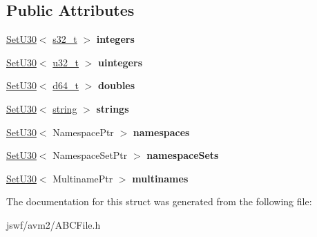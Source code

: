 \subsection*{Public Attributes}
\begin{DoxyCompactItemize}
\item 
\hypertarget{structjswf_1_1avm2_1_1_constant_pool_aab573ed0ddae6cc8a9e66ccb927fb46f}{\hyperlink{classjswf_1_1avm2_1_1_constant_pool_1_1_set_u30}{Set\+U30}$<$ \hyperlink{namespacejswf_a19b2a5980fe3b05994a2127a3c7e0521}{s32\+\_\+t} $>$ {\bfseries integers}}\label{structjswf_1_1avm2_1_1_constant_pool_aab573ed0ddae6cc8a9e66ccb927fb46f}

\item 
\hypertarget{structjswf_1_1avm2_1_1_constant_pool_a605cf0668e98e28d76797a4c6d699368}{\hyperlink{classjswf_1_1avm2_1_1_constant_pool_1_1_set_u30}{Set\+U30}$<$ \hyperlink{namespacejswf_ae68dd480b6437e9a20db7b004283a466}{u32\+\_\+t} $>$ {\bfseries uintegers}}\label{structjswf_1_1avm2_1_1_constant_pool_a605cf0668e98e28d76797a4c6d699368}

\item 
\hypertarget{structjswf_1_1avm2_1_1_constant_pool_a676c0a5a79c9e364979797a4bd9debfa}{\hyperlink{classjswf_1_1avm2_1_1_constant_pool_1_1_set_u30}{Set\+U30}$<$ \hyperlink{namespacejswf_acfbb3c7c9fbb807e233387995eb76a96}{d64\+\_\+t} $>$ {\bfseries doubles}}\label{structjswf_1_1avm2_1_1_constant_pool_a676c0a5a79c9e364979797a4bd9debfa}

\item 
\hypertarget{structjswf_1_1avm2_1_1_constant_pool_a27a70d2cfeb499e512c4fe444a5c0d55}{\hyperlink{classjswf_1_1avm2_1_1_constant_pool_1_1_set_u30}{Set\+U30}$<$ \hyperlink{namespacejswf_a755127d61081aa8af105eb800aa2c1ec}{string} $>$ {\bfseries strings}}\label{structjswf_1_1avm2_1_1_constant_pool_a27a70d2cfeb499e512c4fe444a5c0d55}

\item 
\hypertarget{structjswf_1_1avm2_1_1_constant_pool_a92b85d6fa727cb04267edced3b7ab8ab}{\hyperlink{classjswf_1_1avm2_1_1_constant_pool_1_1_set_u30}{Set\+U30}$<$ Namespace\+Ptr $>$ {\bfseries namespaces}}\label{structjswf_1_1avm2_1_1_constant_pool_a92b85d6fa727cb04267edced3b7ab8ab}

\item 
\hypertarget{structjswf_1_1avm2_1_1_constant_pool_a33af185abce905e790e4f5e6975b23b7}{\hyperlink{classjswf_1_1avm2_1_1_constant_pool_1_1_set_u30}{Set\+U30}$<$ Namespace\+Set\+Ptr $>$ {\bfseries namespace\+Sets}}\label{structjswf_1_1avm2_1_1_constant_pool_a33af185abce905e790e4f5e6975b23b7}

\item 
\hypertarget{structjswf_1_1avm2_1_1_constant_pool_a093544e8eca8f4b8aa6a2a84312d9587}{\hyperlink{classjswf_1_1avm2_1_1_constant_pool_1_1_set_u30}{Set\+U30}$<$ Multiname\+Ptr $>$ {\bfseries multinames}}\label{structjswf_1_1avm2_1_1_constant_pool_a093544e8eca8f4b8aa6a2a84312d9587}

\end{DoxyCompactItemize}


The documentation for this struct was generated from the following file\+:\begin{DoxyCompactItemize}
\item 
jswf/avm2/A\+B\+C\+File.\+h\end{DoxyCompactItemize}
